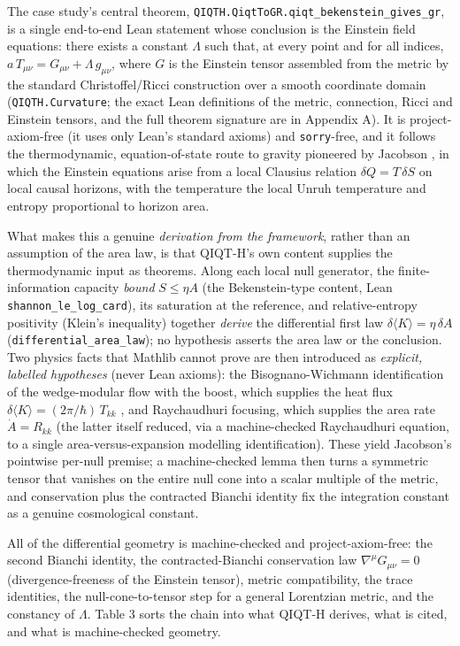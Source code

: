 \documentclass[11pt]{article}
\begin{document}
The case study's central theorem, \texttt{QIQTH.QiqtToGR.qiqt\_bekenstein\_gives\_gr}, is a single
end-to-end Lean statement whose conclusion is the Einstein field equations: there exists a constant
$\Lambda$ such that, at every point and for all indices, $a\,T_{\mu\nu}=G_{\mu\nu}+\Lambda\,g_{\mu\nu}$,
where $G$ is the Einstein tensor assembled from the metric by the standard Christoffel/Ricci
construction over a smooth coordinate domain (\texttt{QIQTH.Curvature}; the exact Lean definitions of the
metric, connection, Ricci and Einstein tensors, and the full theorem signature are in Appendix A).
It is project-axiom-free (it uses only Lean's standard axioms) and \texttt{sorry}-free,
and it follows the thermodynamic, equation-of-state route to gravity pioneered by Jacobson \cite{r46},
in which the Einstein equations arise from a local Clausius relation $\delta Q=T\,\delta S$ on local
causal horizons, with the temperature the local Unruh temperature \cite{r48} and entropy proportional
to horizon area.

What makes this a genuine \emph{derivation from the framework}, rather than an assumption of the area
law, is that QIQT-H's own content supplies the thermodynamic input as theorems. Along each local null
generator, the finite-information capacity \emph{bound} $S\le\eta A$ (the Bekenstein-type content,
Lean \texttt{shannon\_le\_log\_card}), its saturation at the reference, and relative-entropy positivity
(Klein's inequality) together \emph{derive} the differential first law $\delta\langle K\rangle=\eta\,\delta A$
(\texttt{differential\_area\_law}); no hypothesis asserts the area law or the conclusion. Two
physics facts that Mathlib cannot prove are then introduced as \emph{explicit, labelled hypotheses}
(never Lean axioms): the Bisognano-Wichmann identification of the wedge-modular flow with the boost,
which supplies the heat flux $\delta\langle K\rangle=(2\pi/\hbar)\,T_{kk}$ \cite{r47}, and Raychaudhuri
focusing, which supplies the area rate $\dot{A}=R_{kk}$ \cite{r49} (the latter itself reduced, via a
machine-checked Raychaudhuri equation, to a single area-versus-expansion modelling identification).
These yield Jacobson's pointwise per-null premise; a machine-checked lemma then turns a symmetric
tensor that vanishes on the entire null cone into a scalar multiple of the metric, and conservation
plus the contracted Bianchi identity fix the integration constant as a genuine cosmological constant.

All of the differential geometry is machine-checked and project-axiom-free: the second Bianchi
identity, the contracted-Bianchi conservation law $\nabla^\mu G_{\mu\nu}=0$ (divergence-freeness of the Einstein
tensor), metric compatibility, the trace identities, the null-cone-to-tensor step for a general
Lorentzian metric, and the constancy of $\Lambda$. Table 3 sorts the chain into what
QIQT-H derives, what is cited, and what is machine-checked geometry.
\end{document}
